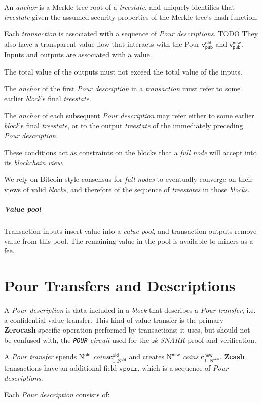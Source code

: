 \documentclass[8pt]{article}
\newcommand{\term}[1]{\textsl{#1}\xspace}
\newcommand{\termbf}[1]{\textbf{#1}\xspace}
\newcommand{\Zcash}{\termbf{Zcash}}
\newcommand{\Zerocash}{\termbf{Zerocash}}
\newcommand{\coins}{\term{coins}}
\newcommand{\PourDescription}{\term{Pour description}}
\newcommand{\PourDescriptions}{\term{Pour descriptions}}
\newcommand{\PourTransfer}{\term{Pour transfer}}
\newcommand{\fullnode}{\term{full node}}
\newcommand{\fullnodes}{\term{full nodes}}
\newcommand{\anchor}{\term{anchor}}
\newcommand{\block}{\term{block}}
\newcommand{\blocks}{\term{blocks}}
\newcommand{\transaction}{\term{transaction}}
\newcommand{\blockchainview}{\term{blockchain view}}
\newcommand{\treestate}{\term{treestate}}
\newcommand{\treestates}{\term{treestates}}
\newcommand{\zkSNARK}{\term{zk-SNARK}}
\newcommand{\vpour}{\mathtt{vpour}}
\newcommand{\NOld}{\mathrm{N}^\mathsf{old}}
\newcommand{\NNew}{\mathrm{N}^\mathsf{new}}
\newcommand{\PourCircuit}{\term{\texttt{POUR} circuit}}
\newcommand{\vpubOld}{\mathsf{v_{pub}^{old}}}
\newcommand{\vpubNew}{\mathsf{v_{pub}^{new}}}
\newcommand{\cOld}[1]{\mathbf{c}_{#1}^\mathsf{old}}
\newcommand{\cNew}[1]{\mathbf{c}_{#1}^\mathsf{new}}
\begin{document}
An \anchor is a Merkle tree root of a \treestate, and uniquely identifies that
\treestate given the assumed security properties of the Merkle tree's hash function.

Each \transaction is associated with a sequence of \PourDescriptions. TODO They also have
a transparent value flow that interacts with the Pour $\vpubOld$ and $\vpubNew$.
Inputs and outputs are associated with a value.

The total value of the outputs must not exceed the total value of the inputs.

The \anchor of the first \PourDescription in a \transaction must refer to some
earlier \block's final \treestate.

The \anchor of each subsequent \PourDescription may refer either to some earlier
\block's final \treestate, or to the output \treestate of the immediately preceding
\PourDescription.

These conditions act as constraints on the blocks that a \fullnode will
accept into its \blockchainview.

We rely on Bitcoin-style consensus for \fullnodes to eventually converge on their 
views of valid \blocks, and therefore of the sequence of \treestates in those 
\blocks.


\subparagraph{Value pool}

Transaction inputs insert value into a \term{value pool}, and transaction outputs 
remove value from this pool. The remaining value in the pool is available to miners 
as a fee.

\section{Pour Transfers and Descriptions}

A \PourDescription is data included in a \block that describes a \PourTransfer,
i.e. a confidential value transfer. This kind of value transfer is the primary
\Zerocash-specific operation performed by transactions; it uses, but should not be
confused with, the \PourCircuit used for the \zkSNARK proof and verification.

A \PourTransfer spends $\NOld$ \coins $\cOld{1..\NOld}$ and creates $\NNew$ \coins
$\cNew{1..\NNew}$. \Zcash transactions have an additional field $\vpour$, which is a
sequence of \PourDescriptions.

Each \PourDescription consists of:
\end{document}
